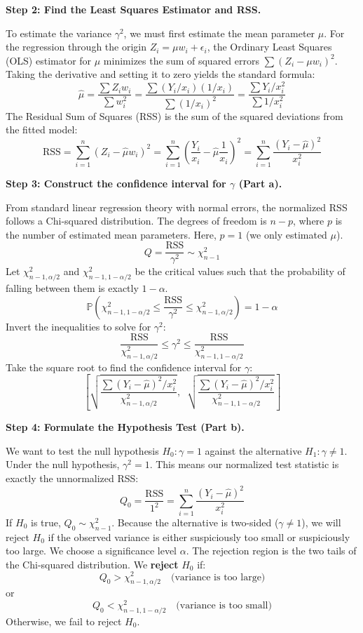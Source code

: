 \begin{solution}
\textbf{Step 2: Find the Least Squares Estimator and RSS.}

To estimate the variance $\gamma^2$, we must first estimate the mean parameter $\mu$.
For the regression through the origin $Z_i = \mu w_i + \epsilon_i$, the Ordinary Least Squares (OLS) estimator for $\mu$ minimizes the sum of squared errors $\sum (Z_i - \mu w_i)^2$.
Taking the derivative and setting it to zero yields the standard formula:
\[ \hat{\mu} = \frac{\sum Z_i w_i}{\sum w_i^2} = \frac{\sum (Y_i/x_i) (1/x_i)}{\sum (1/x_i)^2} = \frac{\sum Y_i/x_i^2}{\sum 1/x_i^2} \]
The Residual Sum of Squares (RSS) is the sum of the squared deviations from the fitted model:
\[ \text{RSS} = \sum_{i=1}^n (Z_i - \hat{\mu} w_i)^2 = \sum_{i=1}^n \left( \frac{Y_i}{x_i} - \hat{\mu} \frac{1}{x_i} \right)^2 = \sum_{i=1}^n \frac{(Y_i - \hat{\mu})^2}{x_i^2} \]

\textbf{Step 3: Construct the confidence interval for $\gamma$ (Part a).}

From standard linear regression theory with normal errors, the normalized RSS follows a Chi-squared distribution. The degrees of freedom is $n - p$, where $p$ is the number of estimated mean parameters. Here, $p=1$ (we only estimated $\mu$).
\[ Q = \frac{\text{RSS}}{\gamma^2} \sim \chi^2_{n-1} \]
Let $\chi^2_{n-1, \alpha/2}$ and $\chi^2_{n-1, 1-\alpha/2}$ be the critical values such that the probability of falling between them is exactly $1 - \alpha$.
\[ \mathbb{P}\left( \chi^2_{n-1, 1-\alpha/2} \leq \frac{\text{RSS}}{\gamma^2} \leq \chi^2_{n-1, \alpha/2} \right) = 1 - \alpha \]
Invert the inequalities to solve for $\gamma^2$:
\[ \frac{\text{RSS}}{\chi^2_{n-1, \alpha/2}} \leq \gamma^2 \leq \frac{\text{RSS}}{\chi^2_{n-1, 1-\alpha/2}} \]
Take the square root to find the confidence interval for $\gamma$:
\[ \left[ \sqrt{ \frac{\sum (Y_i - \hat{\mu})^2 / x_i^2}{\chi^2_{n-1, \alpha/2}} }, \;\; \sqrt{ \frac{\sum (Y_i - \hat{\mu})^2 / x_i^2}{\chi^2_{n-1, 1-\alpha/2}} } \right] \]

\textbf{Step 4: Formulate the Hypothesis Test (Part b).}

We want to test the null hypothesis $H_0: \gamma = 1$ against the alternative $H_1: \gamma \neq 1$.
Under the null hypothesis, $\gamma^2 = 1$. This means our normalized test statistic is exactly the unnormalized RSS:
\[ Q_0 = \frac{\text{RSS}}{1^2} = \sum_{i=1}^n \frac{(Y_i - \hat{\mu})^2}{x_i^2} \]
If $H_0$ is true, $Q_0 \sim \chi^2_{n-1}$.
Because the alternative is two-sided ($\gamma \neq 1$), we will reject $H_0$ if the observed variance is either suspiciously too small or suspiciously too large.
We choose a significance level $\alpha$. The rejection region is the two tails of the Chi-squared distribution.
We \textbf{reject} $H_0$ if:
\[ Q_0 > \chi^2_{n-1, \alpha/2} \quad \text{(variance is too large)} \]
or
\[ Q_0 < \chi^2_{n-1, 1-\alpha/2} \quad \text{(variance is too small)} \]
Otherwise, we fail to reject $H_0$.
\end{solution}

